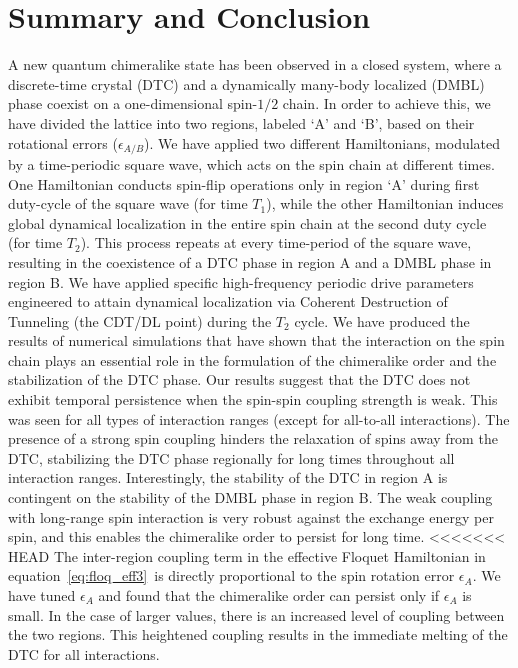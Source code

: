 \documentclass[12pt]{iopart}
\begin{document}
\section{\label{sec:level7} Summary and Conclusion}
A new quantum chimeralike state has been observed in a closed  system, where a discrete-time crystal (DTC) and a dynamically many-body localized (DMBL) phase coexist on a one-dimensional spin-$1/2$ chain. In order to achieve this, we have divided the lattice into two regions, labeled `A' and `B', based on their rotational errors ($\epsilon_{A/B}$). {We have applied two different Hamiltonians, modulated by a time-periodic square wave, which acts on the spin chain at different times. One Hamiltonian conducts spin-flip operations only in region `A' during first duty-cycle of the square wave (for time $T_1$), while the other Hamiltonian induces global dynamical localization in the entire spin chain at the second duty cycle (for time $T_2$). This process repeats at every time-period of the square wave, resulting in the coexistence of a DTC phase in region A and a DMBL phase in region B.} We have applied specific high-frequency periodic drive parameters engineered to attain dynamical localization via Coherent Destruction of Tunneling (the CDT/DL point) during the $T_2$ cycle. We have produced the results of numerical simulations that have shown that the interaction on the spin chain plays an essential role in the formulation of the chimeralike order and the stabilization of the DTC phase. Our results suggest that the DTC does not exhibit temporal persistence when the spin-spin coupling strength is weak. This was seen for all types of interaction ranges (except for all-to-all interactions). The presence of a strong spin coupling hinders the relaxation of spins away from the DTC, stabilizing the DTC phase regionally for long times throughout all interaction ranges. Interestingly, the stability of the DTC in region A is contingent on the stability of the DMBL phase in region B. The weak coupling with long-range spin interaction is very robust against the exchange energy per spin, and this enables the chimeralike order to persist for long time. 
<<<<<<< HEAD
The inter-region coupling term in the effective Floquet Hamiltonian in equation~\ref{eq:floq_eff3} is directly proportional to the spin rotation error $\epsilon_A$. We have tuned $\epsilon_A$ and found that the chimeralike order can persist only if $\epsilon_A$ is small. In the case of larger values, there is an increased level of coupling between the two regions. This heightened coupling results in the immediate melting of the DTC for all interactions.
	
\end{document}
